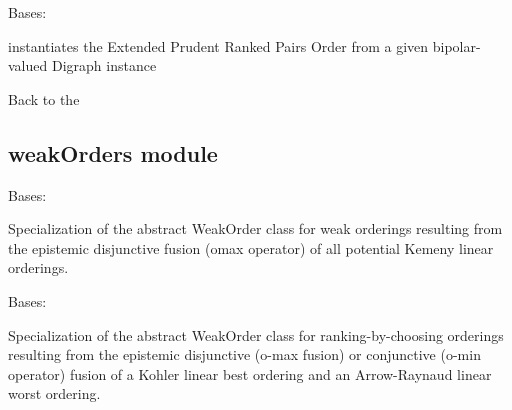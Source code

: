 \documentclass[letterpaper,10pt,english]{sphinxmanual}
\begin{document}

\begin{fulllineitems}
\label{techDoc:linearOrders.RankedPairsOrder}
Bases: {\hyperref[techDoc:linearOrders.LinearOrder]{\emph{}}}

instantiates the Extended Prudent Ranked Pairs Order from
a given bipolar-valued Digraph instance

\end{fulllineitems}


Back to the {\hyperref[techDoc:technical-label]{\emph{}}}


\subsection{weakOrders module}
\label{techDoc:module-weakOrders}\label{techDoc:weakorders-label}\label{techDoc:weakorders-module}

\begin{fulllineitems}
\label{techDoc:weakOrders.KemenyWeakOrder}
Bases: {\hyperref[techDoc:weakOrders.WeakOrder]{\emph{}}}

Specialization of the abstract WeakOrder class for 
weak orderings resulting from the epistemic
disjunctive fusion (omax operator) of
all potential Kemeny linear orderings.

\end{fulllineitems}


\begin{fulllineitems}
\label{techDoc:weakOrders.KohlerArrowRaynaudFusionDigraph}
Bases: {\hyperref[techDoc:weakOrders.WeakOrder]{\emph{}}}

Specialization of the abstract WeakOrder class for 
ranking-by-choosing orderings resulting from the epistemic
disjunctive (o-max fusion) or conjunctive (o-min operator) fusion of a
Kohler linear best ordering and an Arrow-Raynaud linear worst ordering.

\end{fulllineitems}
\end{document}
